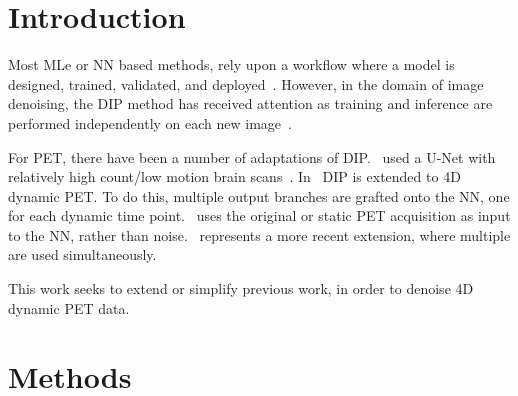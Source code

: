     \section{Introduction} \label{sec:pseudo_bayesian_dip_denoising_as_a_preprocessing_step_for_kinetic_modelling_in_dynamic_pet_appendix_introduction}
        Most \gls{MLe} or \gls{NN} based methods, rely upon a workflow where a model is designed, trained, validated, and deployed~\parencite{Krose1993AnNetworks}. %
        However, in the domain of image denoising, the \gls{DIP} method has received attention as training and inference are performed independently on each new image~\parencite{Ulyanov2020DeepPrior}.%
        
        For \gls{PET}, there have been a number of adaptations of \gls{DIP}.~\parencite{Gong2019PETPrior} used a U-Net with relatively high count/low motion brain scans~\parencite{Weng2021INet:Segmentation}. In~\parencite{Hashimoto20214DNetwork} \gls{DIP} is extended to \gls{4D} dynamic \gls{PET}. To do this, multiple output branches are grafted onto the \gls{NN}, one for each dynamic time point.~\parencite{Hashimoto2019DynamicDatasets} uses the original or static \gls{PET} acquisition as input to the \gls{NN}, rather than noise.~\parencite{Yang2022SimultaneousPrior} represents a more recent extension, where multiple  are used simultaneously.
        
        This work seeks to extend or simplify previous work, in order to denoise \gls{4D} dynamic \gls{PET} data.
    \section{Methods}\label{sec:pseudo_bayesian_dip_denoising_as_a_preprocessing_step_for_kinetic_modelling_in_dynamic_pet_appendix_methods}
